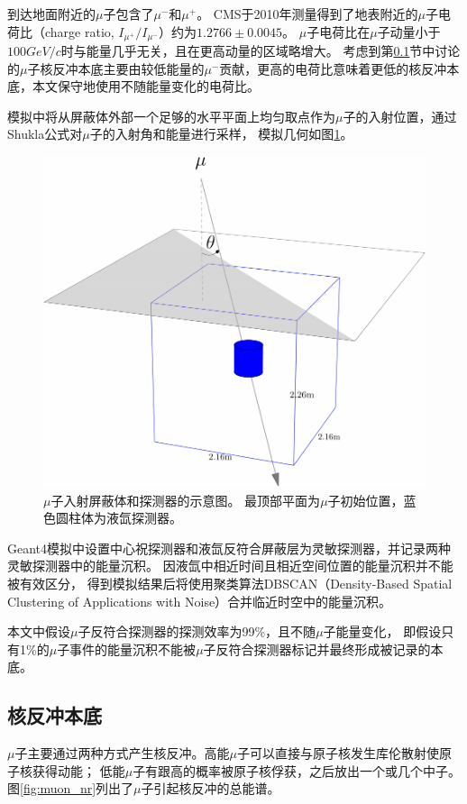 到达地面附近的$\mu$子包含了$\mu^-$和$\mu^+$。
CMS于2010年测量得到了地表附近的$\mu$子电荷比（charge ratio, $I_{\mu^+}/I_{\mu^-}$）约为$1.2766\pm0.0045$\cite{the_cms_collaboration_measurement_2010}。
$\mu$子电荷比在$\mu$子动量小于$100\si{GeV/c}$时与能量几乎无关，且在更高动量的区域略增大。
考虑到第\ref{sec:muon_nr}节中讨论的$\mu$子核反冲本底主要由较低能量的$\mu^-$贡献，更高的电荷比意味着更低的核反冲本底，本文保守地使用不随能量变化的电荷比。

模拟中将从屏蔽体外部一个足够的水平平面上均匀取点作为$\mu$子的入射位置，通过Shukla公式对$\mu$子的入射角和能量进行采样，
模拟几何如图\ref{fig:muon_inject}。

\begin{figure}
  \centering
  \includegraphics[width=0.6\linewidth]{figures/muon_inject.pdf}
  \caption{\label{fig:muon_inject} $\mu$子入射屏蔽体和探测器的示意图。
  最顶部平面为$\mu$子初始位置，蓝色圆柱体为液氙探测器。}
\end{figure}

Geant4模拟中设置中心祝探测器和液氙反符合屏蔽层为灵敏探测器，并记录两种灵敏探测器中的能量沉积。
因液氙中相近时间且相近空间位置的能量沉积并不能被有效区分，
得到模拟结果后将使用聚类算法DBSCAN（Density-Based Spatial Clustering of Applications with Noise）\cite{ester_density-based_1996,schubert_dbscan_2017}合并临近时空中的能量沉积。

本文中假设$\mu$子反符合探测器的探测效率为99\%，且不随$\mu$子能量变化，
即假设只有1\%的$\mu$子事件的能量沉积不能被$\mu$子反符合探测器标记并最终形成被记录的本底。

\subsection{核反冲本底}
\label{sec:muon_nr}

$\mu$子主要通过两种方式产生核反冲。高能$\mu$子可以直接与原子核发生库伦散射使原子核获得动能；
低能$\mu$子有跟高的概率被原子核俘获，之后放出一个或几个中子。图\ref{fig:muon_nr}列出了$\mu$子引起核反冲的总能谱。

